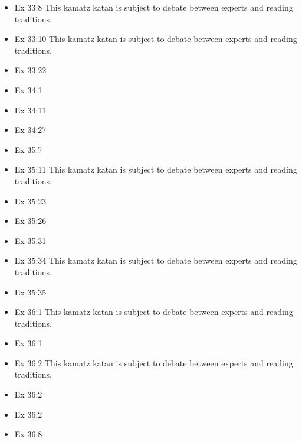 \documentclass[14pt]{article}
\begin{document}
\begin{multicols}{2}
\begin{itemize}
\item Ex 33:8 This kamatz katan is subject to debate between experts and reading traditions.

\item Ex 33:10 This kamatz katan is subject to debate between experts and reading traditions.

\item Ex 33:22

\item Ex 34:1

\item Ex 34:11

\item Ex 34:27

\item Ex 35:7

\item Ex 35:11 This kamatz katan is subject to debate between experts and reading traditions.

\item Ex 35:23

\item Ex 35:26

\item Ex 35:31

\item Ex 35:34 This kamatz katan is subject to debate between experts and reading traditions.

\item Ex 35:35

\item Ex 36:1 This kamatz katan is subject to debate between experts and reading traditions.

\item Ex 36:1

\item Ex 36:2 This kamatz katan is subject to debate between experts and reading traditions.

\item Ex 36:2

\item Ex 36:2

\item Ex 36:8


\end{itemize}
\end{multicols}
\end{document}
